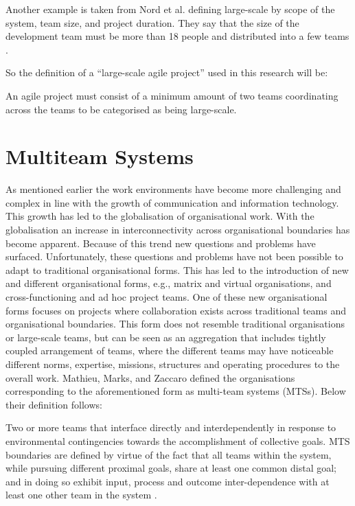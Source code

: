 Another example is taken from Nord et al. defining large-scale by scope of the system, team size, and project duration. They say that the size of the development team must be more than 18 people and distributed into a few teams \cite{Robert2014}.

So the definition of a ``large-scale agile project'' used in this research will be:

\begin{fancyquotes}
An agile project must consist of a minimum amount of two teams coordinating across the teams to be categorised as being large-scale.
\end{fancyquotes}

\textbf{ }

\section{Multiteam Systems}
\label{MTS}

As mentioned earlier the work environments have become more challenging and complex in line with the growth of communication and information technology. This growth has led to the globalisation of organisational work. With the globalisation an increase in interconnectivity across organisational boundaries has become apparent. Because of this trend new questions and problems have surfaced. Unfortunately, these questions and problems have not been possible to adapt to traditional organisational forms. This has led to the introduction of new and different organisational forms, e.g., matrix and virtual organisations, and cross-functioning and ad hoc project teams. One of these new organisational forms focuses on projects where collaboration exists across traditional teams and organisational boundaries. This form does not resemble traditional organisations or large-scale teams, but can be seen as an aggregation that includes tightly coupled arrangement of teams, where the different teams may have noticeable different norms, expertise, missions, structures and operating procedures to the overall work. Mathieu, Marks, and Zaccaro \cite{Mathieu2001} defined the organisations corresponding to the aforementioned form as multi-team systems (MTSs). Below their definition follows:

\begin{fancyquotes}
Two or more teams that interface directly and interdependently in response to environmental contingencies towards the accomplishment of collective goals. MTS boundaries are defined by virtue of the fact that all teams within the system, while pursuing different proximal goals, share at least one common distal goal; and in doing so exhibit input, process and outcome inter-dependence with at least one other team in the system \cite{Mathieu2001}.
\end{fancyquotes}

